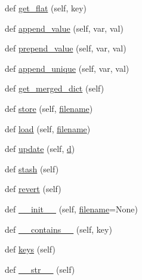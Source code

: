 \begin{DoxyCompactItemize}
\item 
def \hyperlink{classwaflib_1_1_config_set_1_1_config_set_a14b5ef92c4f34cd6edc984fb27fe734f}{get\+\_\+flat} (self, key)
\item 
def \hyperlink{classwaflib_1_1_config_set_1_1_config_set_aa595ce4b9065c7577e554654c1f85f38}{append\+\_\+value} (self, var, val)
\item 
def \hyperlink{classwaflib_1_1_config_set_1_1_config_set_a391d63935edf6ac0e33f82924d188340}{prepend\+\_\+value} (self, var, val)
\item 
def \hyperlink{classwaflib_1_1_config_set_1_1_config_set_add15aa09417ce98bc72232370e62ecc5}{append\+\_\+unique} (self, var, val)
\item 
def \hyperlink{classwaflib_1_1_config_set_1_1_config_set_a31bcce8329d5b407efd49a719ceb7656}{get\+\_\+merged\+\_\+dict} (self)
\item 
def \hyperlink{classwaflib_1_1_config_set_1_1_config_set_a40cccbc7de2812a306847ee5fed9e546}{store} (self, \hyperlink{test__portburn_8cpp_a7efa5e9c7494c7d4586359300221aa5d}{filename})
\item 
def \hyperlink{classwaflib_1_1_config_set_1_1_config_set_aa199c23836c9459d17ecd85a6cd08297}{load} (self, \hyperlink{test__portburn_8cpp_a7efa5e9c7494c7d4586359300221aa5d}{filename})
\item 
def \hyperlink{classwaflib_1_1_config_set_1_1_config_set_a298717d62f84c251b97ee02c7c70cb92}{update} (self, \hyperlink{poly-fir_8h_a2530554172d8629149ec56816eeaa947}{d})
\item 
def \hyperlink{classwaflib_1_1_config_set_1_1_config_set_a9f99d3620bcd107a604135ee4e6efb96}{stash} (self)
\item 
def \hyperlink{classwaflib_1_1_config_set_1_1_config_set_a95b43d10b5c41e35677afb969d03d6bd}{revert} (self)
\item 
def \hyperlink{classwaflib_1_1_config_set_1_1_config_set_a9592d030b3ece10a3cc85e76c6d4d586}{\+\_\+\+\_\+init\+\_\+\+\_\+} (self, \hyperlink{test__portburn_8cpp_a7efa5e9c7494c7d4586359300221aa5d}{filename}=None)
\item 
def \hyperlink{classwaflib_1_1_config_set_1_1_config_set_ad599ed7bbada48771389b986e42137d6}{\+\_\+\+\_\+contains\+\_\+\+\_\+} (self, key)
\item 
def \hyperlink{classwaflib_1_1_config_set_1_1_config_set_a73dc4acb24e0408d47bb9604ab429fbe}{keys} (self)
\item 
def \hyperlink{classwaflib_1_1_config_set_1_1_config_set_a3fafb555a7809f22f984eee5913cbfb8}{\+\_\+\+\_\+str\+\_\+\+\_\+} (self)

\end{DoxyCompactItemize}
